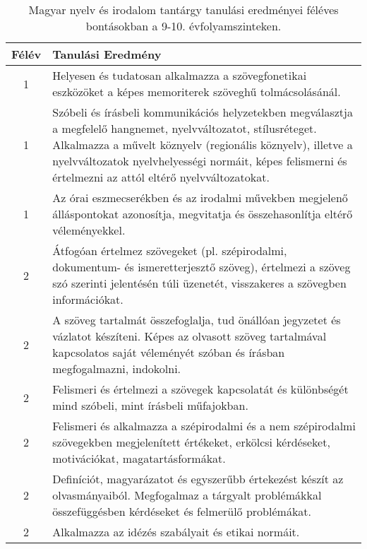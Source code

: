        
           \begin{longtable}{c | p{} }
            \caption[Magyar nyelv és irodalom 9-10.]{Magyar nyelv és irodalom tantárgy tanulási eredményei féléves bontásokban a 9-10. évfolyamszinteken. }  \\

            \textbf{Félév} & \textbf{Tanulási Eredmény} \\
            \hline
            \endhead
                                
                                          1 &  Helyesen és tudatosan alkalmazza a szövegfonetikai eszközöket a képes memoriterek szöveghű tolmácsolásánál. \\ \hline
                                          1 &  Szóbeli és írásbeli kommunikációs helyzetekben megválasztja a megfelelő hangnemet, nyelvváltozatot, stílusréteget. Alkalmazza a művelt köznyelv (regionális köznyelv), illetve a nyelvváltozatok nyelvhelyességi normáit, képes felismerni és értelmezni az attól eltérő nyelvváltozatokat. \\ \hline
                                          1 &  Az órai eszmecserékben és az irodalmi művekben megjelenő álláspontokat azonosítja, megvitatja és összehasonlítja eltérő véleményekkel. \\ \hline
                                      
                                
                                          2 &  Átfogóan értelmez szövegeket (pl. szépirodalmi, dokumentum- és ismeretterjesztő szöveg), értelmezi a szöveg szó szerinti jelentésén túli üzenetét, visszakeres a szövegben információkat. \\ \hline
                                          2 &  A szöveg tartalmát összefoglalja, tud önállóan jegyzetet és vázlatot készíteni. Képes az olvasott szöveg tartalmával kapcsolatos saját véleményét szóban és írásban megfogalmazni, indokolni. \\ \hline
                                          2 &  Felismeri és értelmezi a szövegek kapcsolatát és különbségét mind szóbeli, mint írásbeli műfajokban. \\ \hline
                                          2 &  Felismeri és alkalmazza a szépirodalmi és a nem szépirodalmi szövegekben megjelenített értékeket, erkölcsi kérdéseket, motivációkat, magatartásformákat. \\ \hline
                                          2 &  Definíciót, magyarázatot és egyszerűbb értekezést készít az olvasmányaiból. Megfogalmaz a tárgyalt problémákkal összefüggésben kérdéseket és felmerülő problémákat. \\ \hline
                                          2 &  Alkalmazza az idézés szabályait és etikai normáit. \\ \hline
                                      

\end{longtable}
